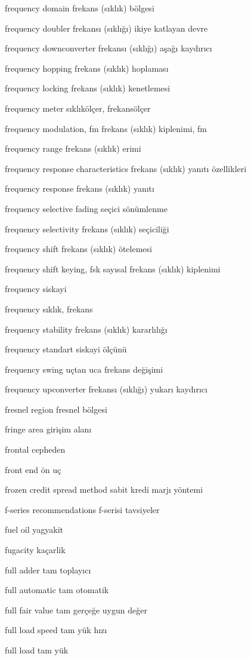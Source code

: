 \documentclass[12pt,fleqn]{article}\usepackage{../../common}
\begin{document}
frequency domain frekans (sıklık) bölgesi

frequency doubler frekansı (sıklığı) ikiye katlayan devre

frequency downconverter frekansı (sıklığı) aşağı kaydırıcı

frequency hopping frekans (sıklık) hoplaması

frequency locking frekans (sıklık) kenetlemesi

frequency meter sıklıkölçer, frekansölçer

frequency modulation, fm frekans (sıklık) kiplenimi, fm

frequency range frekans (sıklık) erimi

frequency response characteristics frekans (sıklık) yanıtı özellikleri

frequency response frekans (sıklık) yanıtı

frequency selective fading seçici sönümlenme

frequency selectivity frekans (sıklık) seçiciliği

frequency shift frekans (sıklık) ötelemesi

frequency shift keying, fsk sayısal frekans (sıklık) kiplenimi

frequency siskayi

frequency sıklık, frekans

frequency stability frekans (sıklık) kararlılığı

frequency standart siskayi ölçünü

frequency swing uçtan uca frekans değişimi

frequency upconverter frekansı (sıklığı) yukarı kaydırıcı

fresnel region fresnel bölgesi

fringe area girişim alanı

frontal cepheden

front end ön uç

frozen credit spread method sabit kredi marjı yöntemi

f-series recommendations f-serisi tavsiyeler

fuel oil yagyakit

fugacity kaçarlik

full adder tam toplayıcı

full automatic tam otomatik

full fair value tam gerçeğe uygun değer

full load speed tam yük hızı

full load tam yük
\end{document}
